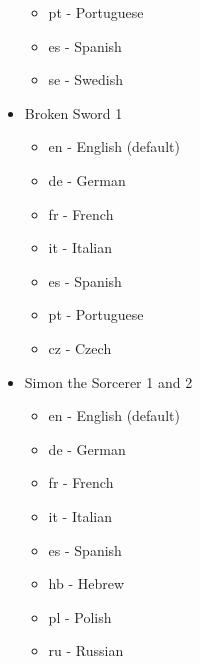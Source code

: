 \begin{itemize}
\begin{itemize}
  \item pt  - Portuguese
  \item es  - Spanish
  \item se  - Swedish
  \end{itemize}
\item Broken Sword 1
  \begin{itemize}
  \item en  - English (default)
  \item de  - German
  \item fr  - French
  \item it  - Italian
  \item es  - Spanish
  \item pt  - Portuguese
  \item cz  - Czech
  \end{itemize}
\item Simon the Sorcerer 1 and 2
  \begin{itemize}
  \item en  - English (default)
  \item de  - German
  \item fr  - French
  \item it  - Italian
  \item es  - Spanish
  \item hb  - Hebrew
  \item pl  - Polish
  \item ru  - Russian
  \end{itemize}
\end{itemize}



